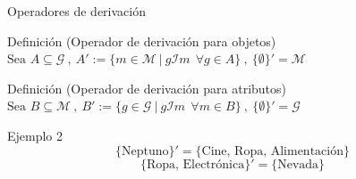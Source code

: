 \documentclass{beamer}
\newcommand{\M}{\mathcal{M}}
\newcommand{\I}{\mathcal{I}}
\newcommand{\G}{\mathcal{G}}
\begin{document}
  \begin{frame}{Operadores de derivación}
    \begin{block}{Definición (Operador de derivación para objetos) }
    $\text{Sea } A\subseteq \G \ , \  A' := \{m \in \M \ | \ g \I m \ \ \forall g \in A\} \ , \ \{\emptyset\}'=\M$
    \end{block}
    
    \begin{block}{Definición (Operador de derivación para atributos) }
    $ \text{Sea } B\subseteq \M \ , \   B':= \{g \in \G \ |\  g \I m \ \ \forall m \in B\} \ , \ \{\emptyset\}'=\G
    $
    \end{block}
    \pause
        \vspace{-1mm}
        \begin{table}[H]
        \end{table}
        \vspace{-3mm}
        \begin{block}{Ejemplo 2}
          $$\{\text{Neptuno}\}'=\{\text{Cine, Ropa, Alimentación}\}$$
          $$\{\text{Ropa, Electrónica}\}'=\{\text{Nevada}\}$$
        \end{block}
        
        \end{frame}
        
\end{document}
